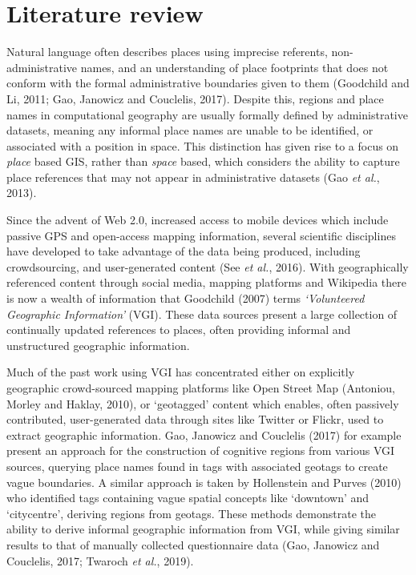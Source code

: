 \documentclass[
  letterpaper,
  11pt,
  english,
  onehalfspacing,
  headsepline]{MastersDoctoralThesis}
\begin{document}
\hypertarget{sec-trans-review}{%
\section{Literature review}\label{sec-trans-review}}

Natural language often describes places using imprecise referents,
non-administrative names, and an understanding of place footprints that
does not conform with the formal administrative boundaries given to them
(Goodchild and Li, 2011; Gao, Janowicz and Couclelis, 2017). Despite
this, regions and place names in computational geography are usually
formally defined by administrative datasets, meaning any informal place
names are unable to be identified, or associated with a position in
space. This distinction has given rise to a focus on \emph{place} based
GIS, rather than \emph{space} based, which considers the ability to
capture place references that may not appear in administrative datasets
(Gao \emph{et al.}, 2013).

Since the advent of Web 2.0, increased access to mobile devices which
include passive GPS and open-access mapping information, several
scientific disciplines have developed to take advantage of the data
being produced, including crowdsourcing, and user-generated content (See
\emph{et al.}, 2016). With geographically referenced content through
social media, mapping platforms and Wikipedia there is now a wealth of
information that Goodchild (2007) terms \emph{`Volunteered Geographic
Information'} (VGI). These data sources present a large collection of
continually updated references to places, often providing informal and
unstructured geographic information.

Much of the past work using VGI has concentrated either on explicitly
geographic crowd-sourced mapping platforms like Open Street Map
(Antoniou, Morley and Haklay, 2010), or `geotagged' content which
enables, often passively contributed, user-generated data through sites
like Twitter or Flickr, used to extract geographic information. Gao,
Janowicz and Couclelis (2017) for example present an approach for the
construction of cognitive regions from various VGI sources, querying
place names found in tags with associated geotags to create vague
boundaries. A similar approach is taken by Hollenstein and Purves (2010)
who identified tags containing vague spatial concepts like `downtown'
and `citycentre', deriving regions from geotags. These methods
demonstrate the ability to derive informal geographic information from
VGI, while giving similar results to that of manually collected
questionnaire data (Gao, Janowicz and Couclelis, 2017; Twaroch \emph{et
al.}, 2019).
\end{document}
